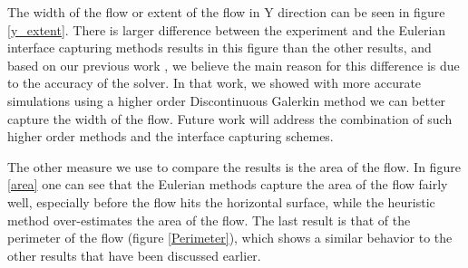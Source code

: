 \documentclass[review]{elsarticle}
\begin{document}
The width of the flow or extent of the flow in Y direction can be seen in figure \ref{y_extent}. 
There is larger difference between the experiment and the Eulerian interface capturing methods results in this figure than the other results, 
and based on our previous work \cite{Patra2006}, we believe the main reason for this difference is due to the accuracy of the solver. 
In that work, we showed with more accurate simulations using a higher order Discontinuous Galerkin method we can better capture the width of the flow.
Future work will address the combination of such higher order methods and the interface capturing schemes.

The other measure we use to compare the results is the area of the flow. 
In figure \ref{area}  one can see that the Eulerian methods capture the area of the flow fairly well,
especially before the flow hits the horizontal surface, while the heuristic method over-estimates the area of the flow. 
The last result is that of the perimeter of the flow (figure \ref{Perimeter}), which shows a similar behavior 
to the other results that have been discussed earlier. 
\end{document}
